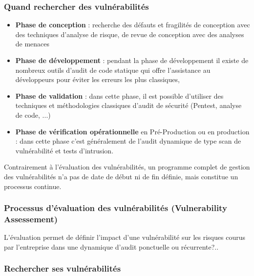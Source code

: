 \begin{frame}
\frametitle<presentation>{Quand rechercher des vulnérabilités}
\begin{itemize}
  \item \textbf{Phase de conception} : recherche des défauts et fragilités de conception avec des techniques d'analyse de risque, de revue de conception avec des analyses de menaces
  \item \textbf{Phase de développement} : pendant la phase de développement il existe de nombreux outils d'audit de code statique qui offre l'assistance au développeurs pour éviter les erreurs les plus classiques,
  \item \textbf{Phase de validation} : dans cette phase, il est possible d'utiliser des techniques et méthodologies classiques d'audit de sécurité (Pentest, analyse de code, ...)
  \item \textbf{Phase de vérification opérationnelle} en Pré-Production ou en production : dans cette phase c'est généralement de l'audit dynamique de type scan de vulnérabilité et tests d'intrusion.
\end{itemize}
\end{frame}

Contrairement à l’évaluation des vulnérabilités, un programme complet de gestion des vulnérabilités n’a pas de date de début ni de fin définie, mais constitue un processus continue.

\subsubsection{Processus d’évaluation des vulnérabilités (Vulnerability Assessement)}


L'évaluation permet de définir l'impact d'une vulnérabilité sur les risques courus par l'entreprise dans une dynamique d'audit ponctuelle ou récurrente?..






\begin{frame}
\frametitle<presentation>{Rechercher ses vulnérabilités}
\end{frame}


